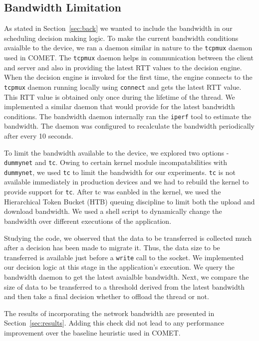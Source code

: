 \subsection{Bandwidth Limitation}
As stated in Section~\ref{sec:back} we wanted to include the bandwidth in our scheduling decision making logic. To make the current bandwidth conditions avaialble to the device, we ran a daemon similar in nature to the \texttt{tcpmux} daemon used in COMET. The \texttt{tcpmux} daemon helps in communication between the client and server and also in providing the latest RTT values to the decision engine. When the decision engine is invoked for the first time, the engine connects to the \texttt{tcpmux} daemon running locally using \texttt{connect} and gets the latest RTT value. This RTT value is obtained only once during the lifetime of the thread. We implemented a similar daemon that would provide for the latest bandwidth conditions. The bandwidth daemon internally ran the \texttt{iperf} tool to estimate the bandwidth. The daemon was configured to recalculate the bandwidth periodically after every 10 seconds.

To limit the bandwidth available to the device, we explored two options - \texttt{dummynet} and \texttt{tc}. Owing to certain kernel module incompatabilities with \texttt{dummynet}, we used \texttt{tc} to limit the bandwidth for our experiments. \texttt{tc} is not available immediately in production devices and we had to rebuild the kernel to provide support for \texttt{tc}. After tc was eanbled in the kernel, we used the Hierarchical Token Bucket (HTB) queuing discipline to limit both the upload and download bandwidth. We used a shell script to dynamically change the bandwidth over different executions of the application.

Studying the code, we observed that the data to be transferred is collected much after a decision has been made to migrate it. Thus, the data size to be transferred is available just before a \texttt{write} call to the socket. We implemented our decision logic at this stage in the application's execution. We query the bandwidth daemon to get the latest avaialble bandwidth. Next, we compare the size of data to be transferred to a threshold derived from the latest bandwidth and then take a final decision whether to offload the thread or not.

The results of incorporating the network bandwidth are presented in Section~\ref{sec:results}. Adding this check did not lead to any performance improvement
over the baseline heuristic used in COMET.
